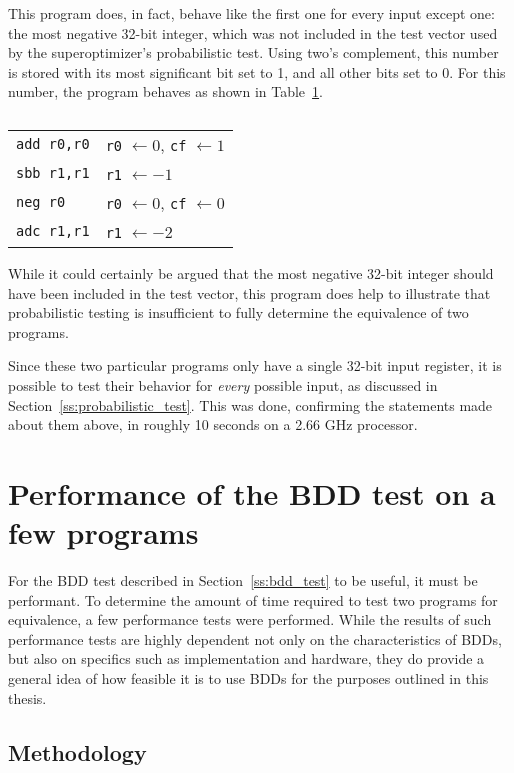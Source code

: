 \documentclass[a4paper,11pt]{kth-mag}
\renewcommand{\gets}{\leftarrow}
\begin{document}
This program does, in fact, behave like the first one for every input except one: the most negative 32-bit integer, which was not included in the test vector used by the superoptimizer's probabilistic test.
Using two's complement, this number is stored with its most significant bit set to 1, and all other bits set to 0.
For this number, the program behaves as shown in Table~\ref{tab:sign_incorrect}.

\begin{table}
\centering
\begin{tabular}{l|l}
\verb|add r0,r0|
& \verb|r0| $\gets 0$, \verb|cf| $\gets 1$ \\
\verb|sbb r1,r1|
& \verb|r1| $\gets -1$ \\
\verb|neg r0|
& \verb|r0| $\gets 0$, \verb|cf| $\gets 0$ \\
\verb|adc r1,r1|
& \verb|r1| $\gets -2$ \\
\end{tabular}
\caption{}
\label{tab:sign_incorrect}
\end{table}

While it could certainly be argued that the most negative 32-bit integer should have been included in the test vector, this program does help to illustrate that probabilistic testing is insufficient to fully determine the equivalence of two programs.

Since these two particular programs only have a single 32-bit input register, it is possible to test their behavior for \emph{every} possible input, as discussed in Section~\ref{ss:probabilistic_test}.
This was done, confirming the statements made about them above, in roughly 10 seconds on a 2.66 GHz processor.

\section{Performance of the BDD test on a few programs}
\label{s:performance_programs}

For the BDD test described in Section~\ref{ss:bdd_test} to be useful, it must be performant.
To determine the amount of time required to test two programs for equivalence, a few performance tests were performed.
While the results of such performance tests are highly dependent not only on the characteristics of BDDs, but also on specifics such as implementation and hardware, they do provide a general idea of how feasible it is to use BDDs for the purposes outlined in this thesis.

\subsection{Methodology}
\end{document}
